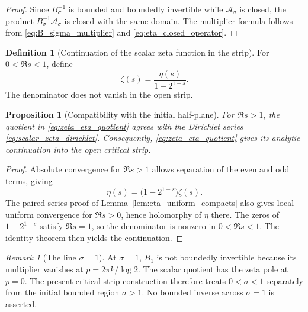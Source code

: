 \documentclass[11pt]{amsart}
\numberwithin{equation}{section}
\theoremstyle{plain}
\newtheorem{proposition}[theorem]{Proposition}
\theoremstyle{definition}
\newtheorem{definition}[theorem]{Definition}
\theoremstyle{remark}
\newtheorem{remark}[theorem]{Remark}
\begin{document}
\begin{proof}
Since $B_\sigma^{-1}$ is bounded and boundedly invertible while
$\mathcal A_\sigma$ is closed, the product
$B_\sigma^{-1}\mathcal A_\sigma$ is closed with the same domain.  The
multiplier formula follows from \eqref{eq:B_sigma_multiplier} and
\eqref{eq:eta_closed_operator}.
\end{proof}

\begin{definition}[Continuation of the scalar zeta function in the strip]
\label{def:zeta_critical_strip}
For $0<\Re s<1$, define
\begin{equation}
\zeta(s)
=\frac{\eta(s)}{1-2^{1-s}}.
\label{eq:zeta_eta_quotient}
\end{equation}
The denominator does not vanish in the open strip.
\end{definition}

\begin{proposition}[Compatibility with the initial half-plane]
\label{prop:zeta_compatibility}
For $\Re s>1$, the quotient in \eqref{eq:zeta_eta_quotient} agrees with the
Dirichlet series \eqref{eq:scalar_zeta_dirichlet}.  Consequently,
\eqref{eq:zeta_eta_quotient} gives its analytic continuation into the open
critical strip.
\end{proposition}

\begin{proof}
Absolute convergence for $\Re s>1$ allows separation of the even and odd
terms, giving
\begin{equation}
\eta(s)
=\bigl(1-2^{1-s}\bigr)\zeta(s).
\label{eq:eta_zeta_scalar_identity}
\end{equation}
The paired-series proof of Lemma~\ref{lem:eta_uniform_compacts} also gives
local uniform convergence for $\Re s>0$, hence holomorphy of $\eta$ there.
The zeros of $1-2^{1-s}$ satisfy $\Re s=1$, so the denominator is nonzero in
$0<\Re s<1$.  The identity theorem then yields the continuation.
\end{proof}

\begin{remark}[The line $\sigma=1$]
\label{rem:sigma_one_boundary}
At $\sigma=1$, $B_1$ is not boundedly invertible because its multiplier
vanishes at $p=2\pi k/\log2$.  The scalar quotient has the zeta pole at
$p=0$.  The present critical-strip construction therefore treats
$0<\sigma<1$ separately from the initial bounded region $\sigma>1$.
No bounded inverse across $\sigma=1$ is asserted.
\end{remark}
\end{document}

